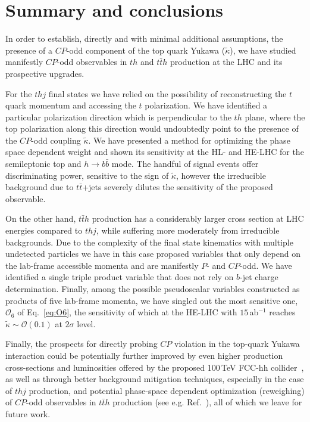 \documentclass[11pt,a4paper]{article}
\newcommand{\mc}[1]{\mathcal{#1}}
\begin{document}
%
\section{Summary and conclusions}
\label{sec:conclusions}
%
In order to establish, directly and with minimal additional assumptions, the presence of a $CP$-odd component of the top quark Yukawa ($\tilde \kappa$), we have studied manifestly $CP$-odd observables in $th$ and $t\bar t h$ production at the LHC and its prospective upgrades.

For the $t h j$ final states we have relied on the possibility of reconstructing the $t$ quark momentum and accessing the $t$ polarization. We have identified a particular polarization direction which is perpendicular to the $t h$ plane, where the top polarization along this direction would undoubtedly point to the presence of the $CP$-odd coupling $\tilde \kappa$. We have presented a method for optimizing the phase space dependent weight and shown its sensitivity at the HL- and HE-LHC for the semileptonic top and $h \to b\bar b$ mode. The handful of signal events offer discriminating power, sensitive to the sign of $\tilde \kappa$, however the irreducible background due to $t \bar t$+jets severely dilutes the sensitivity of the proposed observable.

On the other hand, $t\bar t h$ production has a considerably larger cross section at LHC energies compared to $t h j$, while suffering more moderately from irreducible backgrounds. Due to the complexity of the final state kinematics with multiple undetected particles we have in this case proposed variables that only depend on the lab-frame accessible momenta and are manifestly $P$- and $CP$-odd. We have identified a single triple product variable that does not rely on $b$-jet charge determination. Finally, among the possible pseudoscalar variables constructed as products of five lab-frame momenta, we have singled out the most sensitive one, $\mc{O}_6$ of Eq.~\eqref{eq:O6}, the sensitivity of which at the HE-LHC with $15$\,ab${}^{-1}$ reaches $\tilde \kappa \sim \mathcal{O}(0.1)$ at $2\sigma$ level. 

Finally, the prospects for directly probing $CP$ violation in the top-quark Yukawa interaction could be potentially further improved by even higher production cross-sections and luminosities offered by the proposed 100\,TeV FCC-hh collider~\cite{Mangano:2016jyj, Contino:2016spe,Benedikt:2018csr}, as well as through better background mitigation techniques, especially in the case of $t h j$ production, and potential phase-space dependent optimization (reweighing) of $CP$-odd observables in $t\bar t h$ production (see e.g. Ref.~\cite{Kraus:2019myc}), all of which we leave for future work.

{


}
\end{document}
